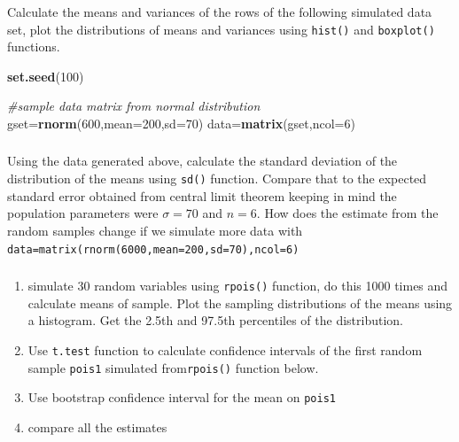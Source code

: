 \documentclass[12pt,]{krantz}
\newenvironment{Shaded}{\begin{snugshade}}{\end{snugshade}}
\newcommand{\CommentTok}[1]{\textcolor[rgb]{0.56,0.35,0.01}{\textit{#1}}}
\newcommand{\DataTypeTok}[1]{\textcolor[rgb]{0.13,0.29,0.53}{#1}}
\newcommand{\DecValTok}[1]{\textcolor[rgb]{0.00,0.00,0.81}{#1}}
\newcommand{\KeywordTok}[1]{\textcolor[rgb]{0.13,0.29,0.53}{\textbf{#1}}}
\newcommand{\NormalTok}[1]{#1}
\providecommand{\tightlist}{%
  \setlength{\itemsep}{0pt}\setlength{\parskip}{0pt}}
\theoremstyle{definition}
\theoremstyle{definition}
\theoremstyle{definition}
\theoremstyle{remark}
\begin{document}
\hypertarget{section}{%
\subsubsection{}\label{section}}

Calculate the means and variances of the rows of the following simulated
data set, plot the distributions of means and variances using
\texttt{hist()} and \texttt{boxplot()} functions.

\begin{Shaded}
\begin{Highlighting}[]
\KeywordTok{set.seed}\NormalTok{(}\DecValTok{100}\NormalTok{)}

\CommentTok{#sample data matrix from normal distribution}
\NormalTok{gset=}\KeywordTok{rnorm}\NormalTok{(}\DecValTok{600}\NormalTok{,}\DataTypeTok{mean=}\DecValTok{200}\NormalTok{,}\DataTypeTok{sd=}\DecValTok{70}\NormalTok{)}
\NormalTok{data=}\KeywordTok{matrix}\NormalTok{(gset,}\DataTypeTok{ncol=}\DecValTok{6}\NormalTok{)}
\end{Highlighting}
\end{Shaded}

\hypertarget{section-1}{%
\subsubsection{}\label{section-1}}

Using the data generated above, calculate the standard deviation of the
distribution of the means using \texttt{sd()} function. Compare that to
the expected standard error obtained from central limit theorem keeping
in mind the population parameters were \(\sigma=70\) and \(n=6\). How
does the estimate from the random samples change if we simulate more
data with \texttt{data=matrix(rnorm(6000,mean=200,sd=70),ncol=6)}

\hypertarget{section-2}{%
\subsubsection{}\label{section-2}}

\begin{enumerate}
\def\labelenumi{\arabic{enumi}.}
\setcounter{enumi}{-1}
\tightlist
\item
  simulate 30 random variables using \texttt{rpois()} function, do this
  1000 times and calculate means of sample. Plot the sampling
  distributions of the means using a histogram. Get the 2.5th and 97.5th
  percentiles of the distribution.
\item
  Use \texttt{t.test} function to calculate confidence intervals of the
  first random sample \texttt{pois1} simulated from\texttt{rpois()}
  function below.
\item
  Use bootstrap confidence interval for the mean on \texttt{pois1}
\item
  compare all the estimates
\end{enumerate}
\end{document}
